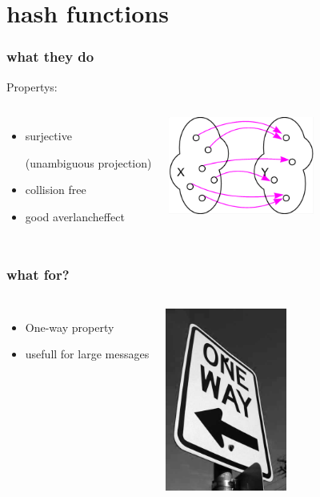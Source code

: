 \section{hash functions}

\begin{frame}
	\frametitle{what they do}
	Propertys:
	\begin{columns}
	\column{6cm}
		\begin{itemize}
			\item surjective \begin{small}(unambiguous projection)\end{small}
			\item collision free
			\item good averlancheffect
		\end{itemize}
	\column{6cm}
		\begin{center}
			\includegraphics[width=4.8cm,height=3.2cm]{surjektiv}
		\end{center}
	\end{columns}
\end{frame}

\begin{frame}
\frametitle{what for?}
	\begin{columns}
	\column{6cm}
		\begin{itemize}
			\item One-way property
			\item usefull for large messages
		\end{itemize}
	\column{6cm}
		\begin{center}
			\includegraphics[width=4cm,height=6cm]{oneway}
		\end{center}
	\end{columns}
\end{frame}

